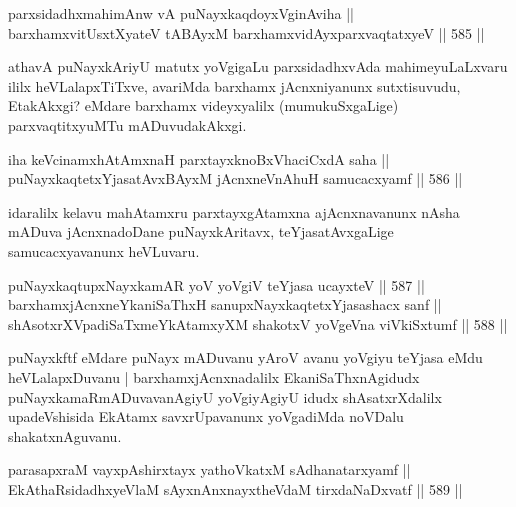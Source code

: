 \begin{shl}
parxsidadhxmahimAnw vA puNayxkaqdoyxVginAviha || \\
barxhamxvitUsxtXyateV tABAyxM barxhamxvidAyxparxvaqtatxyeV \hfill || 585 ||  
\end{shl}

\begin{artha}
athavA puNayxkAriyU matutx yoVgigaLu parxsidadhxvAda mahimeyuLaLxvaru
ililx heVLalapxTiTxve, avariMda barxhamx jAcnxniyanunx sutxtisuvudu,
EtakAkxgi? eMdare barxhamx videyxyalilx (mumukuSxgaLige)
parxvaqtitxyuMTu mADuvudakAkxgi.
\end{artha}


\begin{shl}
iha keVcinamxhAtAmxnaH parxtayxknoBxVhaciCxdA saha || \\
puNayxkaqtetxYjasatAvxBAyxM jAcnxneVnA\s \s huH samucacxyamf \hfill || 586 ||  
\end{shl}

\begin{artha}
idaralilx kelavu mahAtamxru parxtayxgAtamxna ajAcnxnavanunx nAsha
mADuva jAcnxnadoDane puNayxkAritavx, teYjasatAvxgaLige samucacxyavanunx heVLuvaru.
\end{artha}


\begin{shl}
puNayxkaqtupxNayxkamAR yoV yoVgiV teYjasa ucayxteV \hfill || 587 ||  \\
barxhamxjAcnxneYkaniSaThxH sanupxNayxkaqtetxYjasashacx sanf || \\
shAsotxrXVpadiSaTxmeYkAtamxyXM shakotxV yoVgeVna viVkiSxtumf \hfill || 588 ||  
\end{shl}

\begin{artha}
puNayxkftf eMdare puNayx mADuvanu yAroV avanu yoVgiyu teYjasa eMdu
heVLalapxDuvanu | barxhamxjAcnxnadalilx EkaniSaThxnAgidudx
puNayxkamaRmADuvavanAgiyU yoVgiyAgiyU idudx shAsatxrXdalilx
upadeVshisida EkAtamx savxrUpavanunx yoVgadiMda noVDalu shakatxnAguvanu.
\end{artha}

\begin{shl}
parasapxraM vayxpAshirxtayx yathoVkatxM sAdhanatarxyamf || \\
EkAthaRsidadhxyeV\s laM sAyxnAnxnayxtheVdaM tirxdaNaDxvatf \hfill || 589 ||  
\end{shl}

